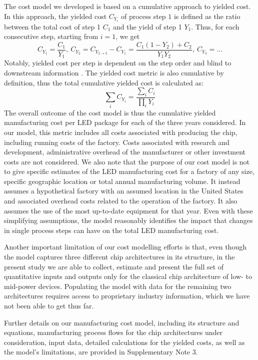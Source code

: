 \documentclass[parskip=full]{article}
\begin{document}
The cost model we developed is based on a cumulative approach to yielded cost\cite{becker2001use}. In this approach, the yielded cost $C_{Y_i}$ of process step $1$ is defined as the ratio between the total cost of step 1 $C_1$ and the yield of step 1 $Y_1$. Thus, for each consecutive step, starting from $i=1$, we get
%
\begin{equation}
    C_{Y_1} = \frac{C_1}{Y_1}, \ C_{Y_2} = C_{Y_{2 \rightarrow 3}} - C_{Y_1} = \frac{C_1(1-Y_2)+C_2}{Y_1Y_2}, \ C_{Y_3}=\dots
\end{equation}
%
Notably, yielded cost per step is dependent on the step order and blind to downstream information \cite{becker2001use}. The yielded cost metric is also cumulative by definition, thus the total cumulative yielded cost is calculated as:
%
\begin{equation}
    \sum_i C_{Y_i} = \frac{\sum_i C_i}{\prod_i Y_i}
\end{equation}
%
The overall outcome of the cost model is thus the cumulative yielded  manufacturing cost per LED package for each of the three years considered. In our model, this metric includes all costs associated with producing the chip, including running costs of the factory. Costs associated with research and development, administrative overhead of the manufacturer or other investment costs are not considered. We also note that the purpose of our cost model is not to give specific estimates of the LED manufacturing cost for a factory of any size, specific geographic location or total annual manufacturing volume. It instead assumes a hypothetical factory with an assumed location in the United States and associated overhead costs related to the operation of the factory. It also assumes the use of the most up-to-date equipment for that year. Even with these simplifying assumptions, the model reasonably identifies the impact that changes in single process steps can have on the total LED manufacturing cost.

Another important limitation of our cost modelling efforts is that, even though the model captures three different chip architectures in its structure, in the present study we are able to collect, estimate and present the full set of quantitative inputs and outputs only for the classical chip architecture of low- to mid-power devices. Populating the model with data for the remaining two architectures requires access to proprietary industry information, which we have not been able to get thus far.

Further details on our manufacturing cost model, including its structure and equations, manufacturing process flows for the chip architectures under consideration, input data, detailed calculations for the yielded costs, as well as the model’s limitations, are provided in Supplementary Note 3. 
\end{document}
